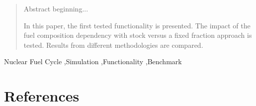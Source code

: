 \documentclass[review]{elsarticle}
\begin{document}
\begin{frontmatter}

\begin{abstract}
Abstract beginning...


In this paper, the first tested functionality is presented. The impact of the fuel composition dependency with stock versus a fixed fraction approach is tested. Results from different methodologies are compared.
\end{abstract}

\begin{keyword}
Nuclear Fuel Cycle \sep Simulation \sep Functionality \sep Benchmark
\end{keyword}

\end{frontmatter}

\linenumbers








\section*{References}


\end{document}
